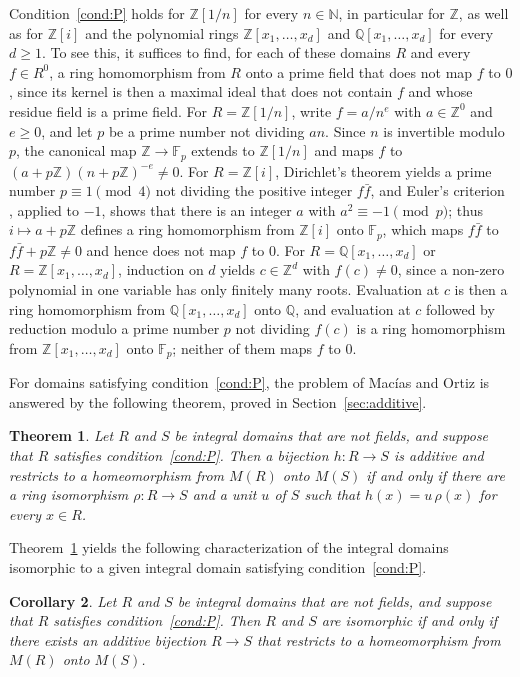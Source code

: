 \documentclass[12pt,reqno,a4paper]{amsart}
\newcommand{\Z}{\mathbb{Z}}
\newcommand{\N}{\mathbb{N}}
\newcommand{\Q}{\mathbb{Q}}
\newcommand{\F}{\mathbb{F}}
\theoremstyle{plain}
\newtheorem{theorem}{Theorem}[section]
\newtheorem{corollary}[theorem]{Corollary}
\theoremstyle{definition}
\begin{document}
Condition~\ref{cond:P} holds for $\Z[1/n]$ for every $n\in\N$, in particular for $\Z$, as well as for $\Z[i]$ and the polynomial rings $\Z[x_1,\dots,x_d]$ and $\Q[x_1,\dots,x_d]$ for every $d\geq1$. To see this, it suffices to find, for each of these domains $R$ and every $f\in R^0$, a ring homomorphism from $R$ onto a prime field that does not map $f$ to $0$, since its kernel is then a maximal ideal that does not contain $f$ and whose residue field is a prime field. For $R=\Z[1/n]$, write $f=a/n^e$ with $a\in\Z^0$ and $e\geq0$, and let $p$ be a prime number not dividing $an$. Since $n$ is invertible modulo $p$, the canonical map $\Z\to\F_p$ extends to $\Z[1/n]$ and maps $f$ to $(a+p\Z)(n+p\Z)^{-e}\neq0$. For $R=\Z[i]$, Dirichlet's theorem \cite[Theorem~2.1]{diri} yields a prime number $p\equiv1\pmod 4$ not dividing the positive integer $f\bar{f}$, and Euler's criterion \cite[Theorem~83]{HardyWright}, applied to $-1$, shows that there is an integer $a$ with $a^2\equiv-1\pmod p$; thus $i\mapsto a+p\Z$ defines a ring homomorphism from $\Z[i]$ onto $\F_p$, which maps $f\bar{f}$ to $f\bar{f}+p\Z\neq0$ and hence does not map $f$ to $0$. For $R=\Q[x_1,\dots,x_d]$ or $R=\Z[x_1,\dots,x_d]$, induction on $d$ yields $c\in\Z^d$ with $f(c)\neq0$, since a non-zero polynomial in one variable has only finitely many roots. Evaluation at $c$ is then a ring homomorphism from $\Q[x_1,\dots,x_d]$ onto $\Q$, and evaluation at $c$ followed by reduction modulo a prime number $p$ not dividing $f(c)$ is a ring homomorphism from $\Z[x_1,\dots,x_d]$ onto $\F_p$; neither of them maps $f$ to $0$.

For domains satisfying condition~\ref{cond:P}, the problem of Mac\'ias and Ortiz is answered by the following theorem, proved in Section~\ref{sec:additive}.
\begin{theorem}\label{thm:additive}
Let $R$ and $S$ be integral domains that are not fields, and suppose that $R$ satisfies condition~\ref{cond:P}. Then a bijection $h\colon R\to S$ is additive and restricts to a homeomorphism from $M(R)$ onto $M(S)$ if and only if there are a ring isomorphism $\rho\colon R\to S$ and a unit $u$ of $S$ such that $h(x)=u\,\rho(x)$ for every $x\in R$.
\end{theorem}


Theorem~\ref{thm:additive} yields the following characterization of the integral domains isomorphic to a given integral domain satisfying condition~\ref{cond:P}.
\begin{corollary}\label{cor:additive-iso}
Let $R$ and $S$ be integral domains that are not fields, and suppose that $R$ satisfies condition~\ref{cond:P}. Then $R$ and $S$ are isomorphic if and only if there exists an additive bijection $R\to S$ that restricts to a homeomorphism from $M(R)$ onto $M(S)$.
\end{corollary}
\end{document}

